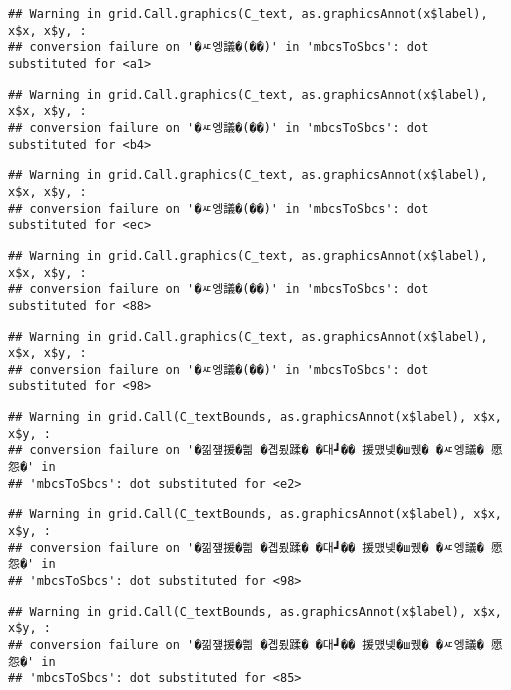 \documentclass[
]{article}
\begin{document}
\begin{verbatim}
## Warning in grid.Call.graphics(C_text, as.graphicsAnnot(x$label), x$x, x$y, :
## conversion failure on '�ㅼ엥議�(��)' in 'mbcsToSbcs': dot substituted for <a1>
\end{verbatim}

\begin{verbatim}
## Warning in grid.Call.graphics(C_text, as.graphicsAnnot(x$label), x$x, x$y, :
## conversion failure on '�ㅼ엥議�(��)' in 'mbcsToSbcs': dot substituted for <b4>
\end{verbatim}

\begin{verbatim}
## Warning in grid.Call.graphics(C_text, as.graphicsAnnot(x$label), x$x, x$y, :
## conversion failure on '�ㅼ엥議�(��)' in 'mbcsToSbcs': dot substituted for <ec>
\end{verbatim}

\begin{verbatim}
## Warning in grid.Call.graphics(C_text, as.graphicsAnnot(x$label), x$x, x$y, :
## conversion failure on '�ㅼ엥議�(��)' in 'mbcsToSbcs': dot substituted for <88>
\end{verbatim}

\begin{verbatim}
## Warning in grid.Call.graphics(C_text, as.graphicsAnnot(x$label), x$x, x$y, :
## conversion failure on '�ㅼ엥議�(��)' in 'mbcsToSbcs': dot substituted for <98>
\end{verbatim}

\begin{verbatim}
## Warning in grid.Call(C_textBounds, as.graphicsAnnot(x$label), x$x, x$y, :
## conversion failure on '�낆쟾援�쁾 �곕룄蹂� �대┛�� 援먰넻�ш퀬� �ㅼ엥議� 愿怨�' in
## 'mbcsToSbcs': dot substituted for <e2>
\end{verbatim}

\begin{verbatim}
## Warning in grid.Call(C_textBounds, as.graphicsAnnot(x$label), x$x, x$y, :
## conversion failure on '�낆쟾援�쁾 �곕룄蹂� �대┛�� 援먰넻�ш퀬� �ㅼ엥議� 愿怨�' in
## 'mbcsToSbcs': dot substituted for <98>
\end{verbatim}

\begin{verbatim}
## Warning in grid.Call(C_textBounds, as.graphicsAnnot(x$label), x$x, x$y, :
## conversion failure on '�낆쟾援�쁾 �곕룄蹂� �대┛�� 援먰넻�ш퀬� �ㅼ엥議� 愿怨�' in
## 'mbcsToSbcs': dot substituted for <85>
\end{verbatim}
\end{document}
